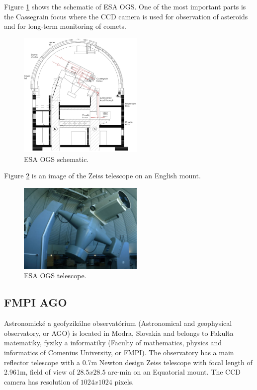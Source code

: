 	Figure \ref{fig:esaogs1} shows the schematic of ESA OGS. One of the most important parts is the Cassegrain focus where the CCD camera is used for observation of asteroids and for long-term monitoring of comets.


\begin{figure}[H]
\centering
  \includegraphics[width=6cm]{images/ESAOGS1}
  \caption{ESA OGS schematic.}
  \label{fig:esaogs1}
\end{figure}

	Figure \ref{fig:esaogs2} is an image of the Zeiss telescope on an English mount.

\begin{figure}[H]
\centering
  \includegraphics[width=6cm]{images/ESAOGS2}
  \caption{ESA OGS telescope.}
  \label{fig:esaogs2}
\end{figure}

\subsection{FMPI AGO}\label{subsec:fmpi_ago}
Astronomické a geofyzikálne observatórium (Astronomical and geophysical observatory, or AGO) is located in Modra, Slovakia and belongs to Fakulta matematiky, fyziky a informatiky (Faculty of mathematics, physics and informatics of Comenius University, or FMPI). The observatory has a main reflector telescope with a 0.7m Newton design Zeiss telescope with focal length of 2.961m, field of view of $28.5 x 28.5$ arc-min on an Equatorial mount. The CCD camera has resolution of $1024 x 1024$ pixels.

